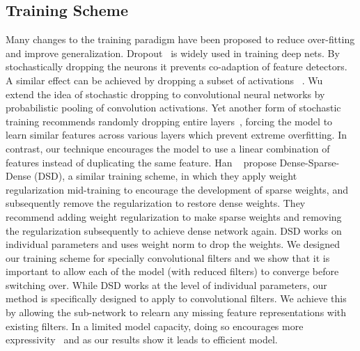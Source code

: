 \subsection{Training Scheme } 
Many changes to the training paradigm have been proposed to reduce over-fitting and improve generalization.
Dropout~\cite{Wu2015TowardsDT} is widely used in training deep nets. 
By stochastically dropping the neurons it prevents co-adaption of feature detectors.
A similar effect can be achieved by dropping a subset of activations ~\cite{Wan2013RegularizationON}.
Wu \etal~\cite{Wu2015TowardsDT} extend the idea of stochastic dropping to convolutional neural networks by probabilistic pooling of convolution activations.
Yet another form of stochastic training recommends randomly dropping entire layers~\cite{Huang2016DeepNW}, forcing the model to learn similar features across various layers which prevent extreme overfitting.
In contrast, our technique encourages the model to use a linear combination of features instead of duplicating the same feature.
Han \etal~\cite{Han2016DSDDT} propose Dense-Sparse-Dense (DSD), a similar training scheme, in which they apply weight regularization mid-training to encourage the development of sparse weights, and subsequently remove the regularization to restore dense weights.
They recommend adding weight regularization to make sparse weights and removing the regularization subsequently to achieve dense network again.
DSD works on individual parameters and uses weight norm to drop the weights. 
We designed our training scheme for specially convolutional filters and we show that it is important to allow each of the model (with reduced filters) to converge before switching over. 
While DSD works at the level of individual parameters, our method is specifically designed to apply to convolutional filters.
We achieve this by allowing the sub-network to relearn any missing feature representations with existing filters.
In a limited model capacity, doing so encourages more expressivity~\cite{Raghu2017OnTE} and as our results show it leads to efficient model.



